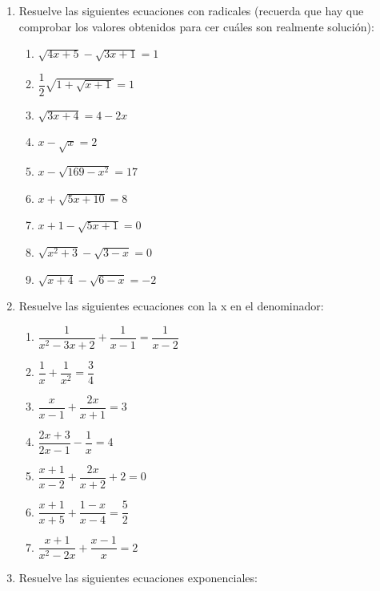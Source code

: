 \documentclass[11pt,a4paper]{article}
\begin{document}
\begin{enumerate}
        \begin{enumerate}
            \item $4x^4-x^3-28x^2+31x-6=0$
            \item $x^3 -7x^2 -4x+28 =0$
            \item $x^3 +7x+15 = 7x^2 $
        \end{enumerate}
    \item Resuelve las siguientes ecuaciones con radicales (recuerda que hay que comprobar los valores obtenidos para cer cuáles son realmente solución):
        \begin{enumerate}
            \item $\sqrt{4x+5}-\sqrt{3x+1}=1$
            \item $\dfrac{1}{2}\sqrt{1+\sqrt{x+1}}=1$
            \item $\sqrt{3x + 4} = 4 - 2x$
            \item $x - \sqrt{x} = 2$
            \item $x - \sqrt{169 - x^2} = 17$
            \item $x + \sqrt{5x + 10} = 8$
            \item $x + 1 - \sqrt{5x + 1} = 0$
            \item $\sqrt{x^2 + 3} - \sqrt{3 - x} = 0$
            \item $\sqrt{x + 4} - \sqrt{6 - x} = -2$
        \end{enumerate}
    \item Resuelve las siguientes ecuaciones con la x en el denominador:
        \begin{enumerate}
            \item $\dfrac{1}{x^2-3x+2}+\dfrac{1}{x-1}=\dfrac{1}{x-2}$
            \item $\dfrac{1}{x} + \dfrac{1}{x^2} = \dfrac{3}{4}$
            \item $\dfrac{x}{x-1} + \dfrac{2x}{x+1} = 3$
            \item $\dfrac{2x+3}{2x-1} - \dfrac{1}{x} = 4$
            \item $\dfrac{x+1}{x-2} + \dfrac{2x}{x+2} + 2 = 0$
            \item $\dfrac{x+1}{x+5} + \dfrac{1-x}{x-4} = \dfrac{5}{2}$
            \item $\dfrac{x+1}{x^2-2x} + \dfrac{x-1}{x} = 2$
        \end{enumerate}
    \item Resuelve las siguientes ecuaciones exponenciales:
        \begin{enumerate}

\end{enumerate}
\end{enumerate}
\end{document}
